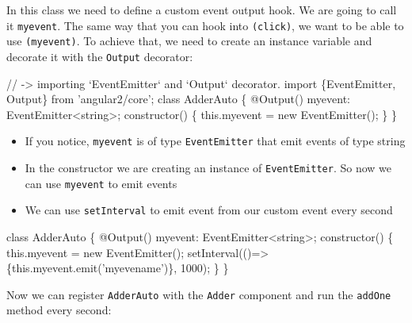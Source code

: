 \documentclass[12pt,]{article}
\newenvironment{Shaded}{}{}
\newcommand{\KeywordTok}[1]{\textcolor[rgb]{0.00,0.00,1.00}{{#1}}}
\newcommand{\DecValTok}[1]{{#1}}
\newcommand{\CommentTok}[1]{\textcolor[rgb]{0.00,0.50,0.00}{{#1}}}
\newcommand{\FunctionTok}[1]{{#1}}
\newcommand{\NormalTok}[1]{{#1}}
\providecommand{\tightlist}{%
  \setlength{\itemsep}{0pt}\setlength{\parskip}{0pt}}
\begin{document}
In this class we need to define a custom event output hook. We are going
to call it \texttt{myevent}. The same way that you can hook into
\texttt{(click)}, we want to be able to use \texttt{(myevent)}. To
achieve that, we need to create an instance variable and decorate it
with the \texttt{Output} decorator:

\begin{Shaded}
\begin{Highlighting}[numbers=left,,]
\CommentTok{// -> importing `EventEmitter` and `Output` decorator.}
\KeywordTok{import \{EventEmitter, Output\} from 'angular2/core';}
\KeywordTok{class} \NormalTok{AdderAuto \{}
  \FunctionTok{@Output}\NormalTok{() myevent: EventEmitter<string>;}
  \FunctionTok{constructor}\NormalTok{() \{}
    \KeywordTok{this}\NormalTok{.}\FunctionTok{myevent} \NormalTok{= }\KeywordTok{new} \FunctionTok{EventEmitter}\NormalTok{();}
  \NormalTok{\}}
\NormalTok{\}}
\end{Highlighting}
\end{Shaded}

\begin{itemize}
\tightlist
\item
  If you notice, \texttt{myevent} is of type \texttt{EventEmitter} that
  emit events of type string
\item
  In the constructor we are creating an instance of
  \texttt{EventEmitter}. So now we can use \texttt{myevent} to emit
  events
\item
  We can use \texttt{setInterval} to emit event from our custom event
  every second
\end{itemize}

\begin{Shaded}
\begin{Highlighting}[numbers=left,,]
\KeywordTok{class} \NormalTok{AdderAuto \{}
  \FunctionTok{@Output}\NormalTok{() myevent: EventEmitter<string>;}
  \FunctionTok{constructor}\NormalTok{() \{}
    \KeywordTok{this}\NormalTok{.}\FunctionTok{myevent} \NormalTok{= }\KeywordTok{new} \FunctionTok{EventEmitter}\NormalTok{();}
    \FunctionTok{setInterval}\NormalTok{(()=> \{}\KeywordTok{this}\NormalTok{.}\FunctionTok{myevent}\NormalTok{.}\FunctionTok{emit}\NormalTok{('myevename')\}, }\DecValTok{1000}\NormalTok{);}
  \NormalTok{\}}
\NormalTok{\}}
\end{Highlighting}
\end{Shaded}

Now we can register \texttt{AdderAuto} with the \texttt{Adder} component
and run the \texttt{addOne} method every second:
\end{document}

